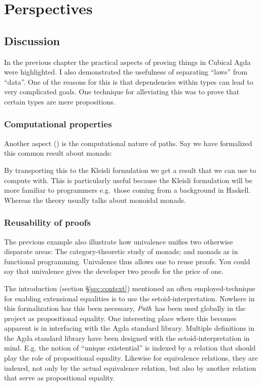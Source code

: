 \chapter{Perspectives}
\section{Discussion}
In the previous chapter the practical aspects of proving things in Cubical Agda
were highlighted. I also demonstrated the usefulness of separating ``laws'' from
``data''. One of the reasons for this is that dependencies within types can lead
to very complicated goals. One technique for alleviating this was to prove that
certain types are mere propositions.

\subsection{Computational properties}
Another aspect () is the computational nature of paths. Say we have
formalized this common result about monads:


By transporting this to the Kleisli formulation we get a result that we can use
to compute with. This is particularly useful because the Kleisli formulation
will be more familiar to programmers e.g.\ those coming from a background in
Haskell. Whereas the theory usually talks about monoidal monads.


\subsection{Reusability of proofs}
The previous example also illustrate how univalence unifies two otherwise
disparate areas: The category-theoretic study of monads; and monads as in
functional programming. Univalence thus allows one to reuse proofs. You could
say that univalence gives the developer two proofs for the price of one.

The introduction (section \S\ref{sec:context}) mentioned an often
employed-technique for enabling extensional equalities is to use the
setoid-interpretation. Nowhere in this formalization has this been necessary,
$\Path$ has been used globally in the project as propositional equality. One
interesting place where this becomes apparent is in interfacing with the Agda
standard library. Multiple definitions in the Agda standard library have been
designed with the setoid-interpretation in mind. E.g. the notion of ``unique
existential'' is indexed by a relation that should play the role of
propositional equality. Likewise for equivalence relations, they are indexed,
not only by the actual equivalence relation, but also by another relation that
serve as propositional equality.

